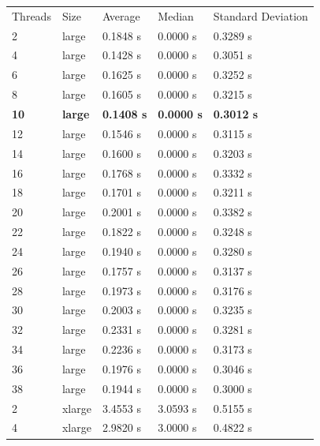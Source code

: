 \documentclass{article}
\begin{document}
\begin{center}
\begin{tabular}{lllll}
 Threads    &  Size     &  Average    &  Median     &  Standard Deviation  \\
 2   &  large    &  0.1848 s   &  0.0000 s   &  0.3289 s            \\
 4   &  large    &  0.1428 s   &  0.0000 s   &  0.3051 s            \\
 6   &  large    &  0.1625 s   &  0.0000 s   &  0.3252 s            \\
 8   &  large    &  0.1605 s   &  0.0000 s   &  0.3215 s            \\
 \textbf{10}  & \textbf{large}    & \textbf{0.1408 s}   &  \textbf{0.0000 s}   &  \textbf{0.3012 s}            \\
 12  &  large    &  0.1546 s   &  0.0000 s   &  0.3115 s            \\
 14  &  large    &  0.1600 s   &  0.0000 s   &  0.3203 s            \\
 16  &  large    &  0.1768 s   &  0.0000 s   &  0.3332 s            \\
 18  &  large    &  0.1701 s   &  0.0000 s   &  0.3211 s            \\
 20  &  large    &  0.2001 s   &  0.0000 s   &  0.3382 s            \\
 22  &  large    &  0.1822 s   &  0.0000 s   &  0.3248 s            \\
 24  &  large    &  0.1940 s   &  0.0000 s   &  0.3280 s            \\
 26  &  large    &  0.1757 s   &  0.0000 s   &  0.3137 s            \\
 28  &  large    &  0.1973 s   &  0.0000 s   &  0.3176 s            \\
 30  &  large    &  0.2003 s   &  0.0000 s   &  0.3235 s            \\
 32  &  large    &  0.2331 s   &  0.0000 s   &  0.3281 s            \\
 34  &  large    &  0.2236 s   &  0.0000 s   &  0.3173 s            \\
 36  &  large    &  0.1976 s   &  0.0000 s   &  0.3046 s            \\
 38  &  large    &  0.1944 s   &  0.0000 s   &  0.3000 s            \\
 2   &  xlarge   &  3.4553 s   &  3.0593 s   &  0.5155 s            \\
 4   &  xlarge   &  2.9820 s   &  3.0000 s   &  0.4822 s            \\

\end{tabular}
\end{center}
\end{document}
